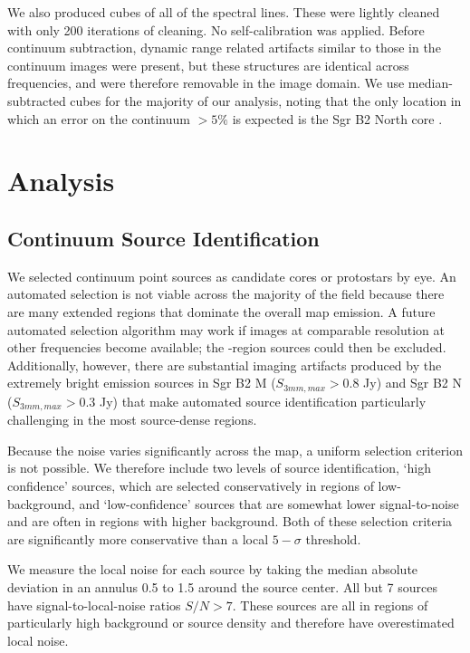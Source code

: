 \documentclass{emulateapj}
\begin{document}
We also produced cubes of all of the spectral lines.  These were lightly
cleaned with only 200 iterations of cleaning.  No self-calibration was applied.
Before continuum subtraction, dynamic range related artifacts similar to those
in the continuum images were present, but these structures are identical across
frequencies, and were therefore removable in the image domain.  We use
median-subtracted cubes for the majority of our analysis, noting that the only
location in which an error on the continuum $>5\%$ is expected is the Sgr B2
North core \citep{Sanchez-Monge2017a}.

\section{Analysis}

\subsection{Continuum Source Identification}
\label{sec:contsources}
We selected continuum point sources as candidate cores or protostars by eye.
An automated selection is not viable across the majority of the field because
there are many extended \hii regions that dominate the overall map emission.  A
future automated selection algorithm may work if images at comparable
resolution at other frequencies become available; the \hii-region sources could
then be excluded.  Additionally, however, there are substantial imaging
artifacts produced by the extremely bright emission sources in Sgr B2 M ($S_{3
mm,max} > 0.8$ Jy) and Sgr B2 N ($S_{3 mm,max} > 0.3$ Jy) that make automated
source identification particularly challenging in the most source-dense regions.

Because the noise varies significantly across the map, a uniform selection
criterion is not possible.  We therefore include two levels of source
identification, `high confidence' sources, which are selected conservatively in
regions of low-background, and `low-confidence' sources that are somewhat lower
signal-to-noise and are often in regions with higher background.  Both of
these selection criteria are significantly more conservative than a local
$5-\sigma$ threshold.

We measure the local noise for each source by taking the median absolute
deviation in an annulus 0.5 to 1.5 \arcsec around the source center.
All but 7 sources have signal-to-local-noise ratios $S/N>7$.  These
sources are all in regions of particularly high background or source
density and therefore have overestimated local noise.
\end{document}
